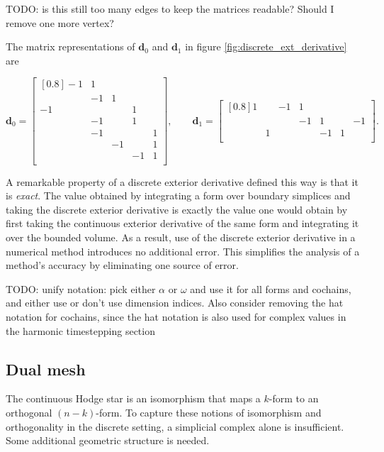 \documentclass[utf8,english]{gradu3}
\begin{document}
TODO: is this still too many edges to keep the matrices readable?
Should I remove one more vertex?

The matrix representations of $\mathbf{d}_0$ and $\mathbf{d}_1$
in figure \ref{fig:discrete_ext_derivative} are

\[
  \mathbf{d}_0 = \begin{bmatrix}[0.8]
    -1 & 1 \\
       & -1 & 1 \\
    -1 & & & 1 \\
       & -1 & & 1 \\
       & -1 & & & 1 \\
       & & -1 & & 1 \\
       & & & -1 & 1 \\
  \end{bmatrix},
  \qquad
  \mathbf{d}_1 = \begin{bmatrix}[0.8]
    1 & & -1 & 1 \\
      & & & -1 & 1 & & -1 \\
      & 1 & & & -1 & 1 \\
  \end{bmatrix}.
\]

A remarkable property of a discrete exterior derivative
defined this way is that it is \textit{exact}.
The value obtained by integrating a form over boundary simplices
and taking the discrete exterior derivative
is exactly the value one would obtain
by first taking the continuous exterior derivative of the same form
and integrating it over the bounded volume.
As a result, use of the discrete exterior derivative in a numerical method
introduces no additional error.
This simplifies the analysis of a method's accuracy
by eliminating one source of error.

TODO: unify notation: pick either $\alpha$ or $\omega$
and use it for all forms and cochains,
and either use or don't use dimension indices.
Also consider removing the hat notation for cochains,
since the hat notation is also used for complex values
in the harmonic timestepping section

\subsection{Dual mesh}\label{sec:dual_mesh}

The continuous Hodge star is an isomorphism
that maps a $k$-form to an orthogonal $(n-k)$-form.
To capture these notions of isomorphism and orthogonality
in the discrete setting, a simplicial complex alone is insufficient.
Some additional geometric structure is needed.
\end{document}
